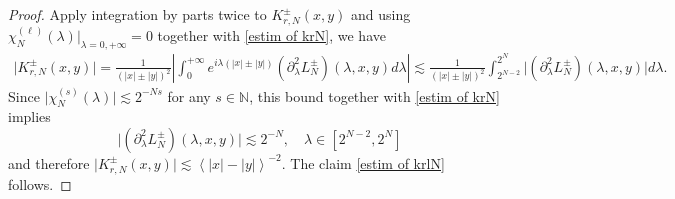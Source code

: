 \documentclass[10pt,a4paper]{amsart}
\newcommand\N{\mathbb{N}}
\begin{document}
\begin{proof}
Apply integration by parts twice to $K^{\pm}_{r,N}(x,y)$ and using ${\chi}^{(\ell)}_N(\lambda)\big|_{\lambda=0,+\infty}=0$ together with \eqref{estim of krN}, we have
\begin{align*}
\big|K^{\pm}_{r,N}(x,y)\big|=\frac{1}{(|x|\pm|y|)^2}\left|\int_{0}^{+\infty}e^{i\lambda(|x|\pm |y|)}(\partial^2_{\lambda}L^{\pm}_{N})(\lambda,x,y)d\lambda\right|\lesssim\frac{1}{(|x|\pm |y|)^2}\int_{2^{N-2}}^{2^N}\big|(\partial^2_{\lambda}L^{\pm}_{N})(\lambda,x,y)\big|d\lambda.
\end{align*}
Since
$\big|{\chi}^{(s)}_{N}(\lambda)\big|\lesssim2^{-Ns}$ for any $s\in\N$,
this bound together with \eqref{estim of krN} implies 
$$\big|(\partial^2_{\lambda}L^{\pm}_{N})(\lambda,x,y)\big|\lesssim 2^{-N},\quad \lambda\in[2^{N-2},2^N]$$
and therefore $\big|K^{\pm}_{r,N}(x,y)\big|\lesssim \left<|x|-|y|\right>^{-2}.$ The claim \eqref{estim of krlN} follows.
\end{proof}
\end{document}
